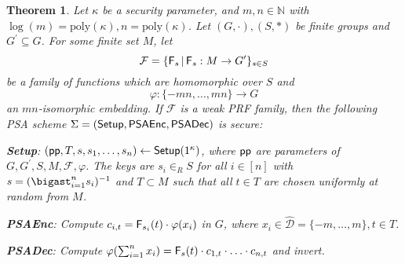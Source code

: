 \documentclass[10pt]{extarticle}
\newtheorem{Thm}{Theorem}
\begin{document}
\begin{Thm}\label{PSATHEOREM}
Let $\kappa$ be a security parameter, and $m,n\in\mathbb{N}$ with $\log(m)=\text{poly}(\kappa),n=\text{poly}(\kappa)$. Let $(G,\cdot), (S,*)$ be finite groups and $G^\prime\subseteq G$. For some finite set $M$, let \[\mathcal{F}=\{\text{\upshape\sffamily F}_s\,|\,\text{\upshape\sffamily F}_s:M\to G^\prime\}_{s\in S}\] be a family of functions which are homomorphic over $S$ and \[\varphi:\{-mn,\ldots,mn\}\to G\] an $mn$-isomorphic embedding. If $\mathcal{F}$ is a weak PRF family, then the following PSA scheme $\Sigma=(\mbox{\upshape\sffamily Setup}, \mbox{\upshape\sffamily PSAEnc}, \mbox{\upshape\sffamily PSADec})$ is secure:
\begin{description}
\item \textbf{\mbox{\upshape \sffamily Setup}}: $(\mbox{\upshape\sffamily pp},T,s,s_1,\ldots,s_n)\leftarrow \mbox{\upshape\sffamily Setup}(1^\kappa)$, where $\mbox{\upshape\sffamily pp}$ are parameters of $G,G^\prime,S,M,\mathcal{F},\varphi$. The keys are $s_i\in_R S$ for all $i\in[n]$ with $s=(\bigast_{i=1}^n s_i)^{-1}$ and $T\subset M$ such that all $t\in T$ are chosen uniformly at random from $M$.
\item \textbf{\mbox{\upshape \sffamily PSAEnc}}: Compute $c_{i,t}=\text{\upshape\sffamily F}_{s_i}(t)\cdot \varphi(x_i)$ in $G$, where $x_i\in\widehat{\mathcal{D}}=\{-m,\ldots,m\}, t\in T$.
\item \textbf{\mbox{\upshape \sffamily PSADec}}: Compute $\varphi(\sum_{i=1}^n x_i)=\text{\upshape\sffamily F}_s(t)\cdot c_{1,t}\cdot\ldots\cdot c_{n,t}$ and invert.
\end{description}
\end{Thm}
\end{document}
